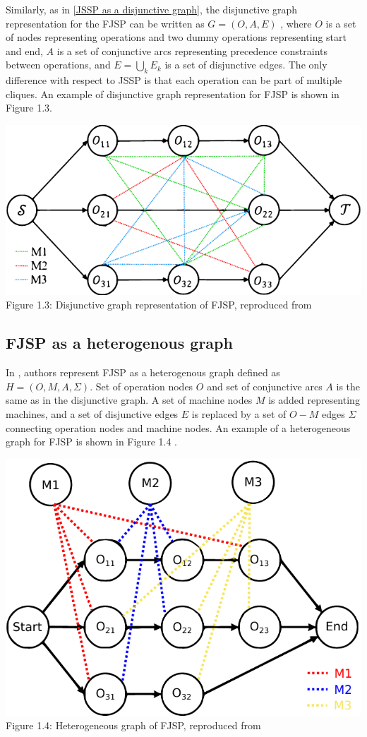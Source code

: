 Similarly, as in \ref{JSSP as a disjunctive graph}, the disjunctive graph representation for the FJSP can be written as $G = (O, A, E)$ \cite{Brandimarte_1993, 9826438, LEI2022117796}, where $O$ is a set of nodes representing operations and two dummy operations representing start and end, $A$ is a set of conjunctive arcs representing precedence constraints between operations, and $E = \bigcup_{k} E_k$ is a set of disjunctive edges. The only difference with respect to JSSP is that each operation can be part of multiple cliques. An example of disjunctive graph representation for FJSP is shown in Figure 1.3.
\begin{center}
    \includegraphics[width=0.75\linewidth]{images/fjsp_disjunctive_graph.pdf}\\
    Figure 1.3: Disjunctive graph representation of FJSP, reproduced from \cite{LEI2022117796}
\end{center}

\subsection{FJSP as a heterogenous graph}

In \cite{9826438}, authors represent FJSP as a heterogenous graph defined as $H = (O, M, A, \Sigma)$. Set of operation nodes $O$ and set of conjunctive arcs $A$ is the same as in the disjunctive graph. A set of machine nodes $M$ is added representing machines, and a set of disjunctive edges $E$ is replaced by a set of $O-M$ edges $\Sigma$ connecting operation nodes and machine nodes. An example of a heterogeneous graph for FJSP is shown in Figure 1.4 \cite{9826438}.
\begin{center}
    \includegraphics[width=0.75\linewidth]{images/fjsp_heterogenous_graph.pdf}\\
    Figure 1.4: Heterogeneous graph of FJSP, reproduced from \cite{LEI2022117796}
\end{center}

